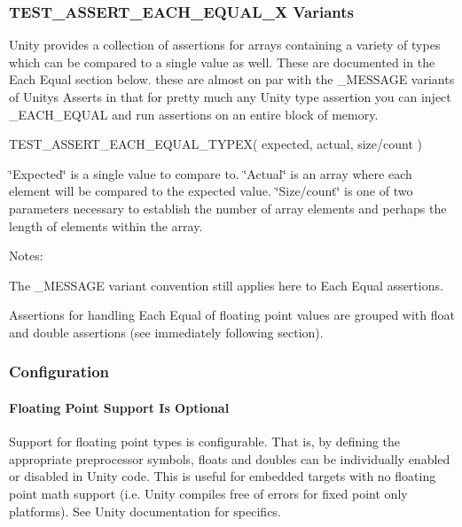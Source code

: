 \subsubsection*{T\+E\+S\+T\+\_\+\+A\+S\+S\+E\+R\+T\+\_\+\+E\+A\+C\+H\+\_\+\+E\+Q\+U\+A\+L\+\_\+X Variants}

Unity provides a collection of assertions for arrays containing a variety of types which can be compared to a single value as well. These are documented in the Each Equal section below. these are almost on par with the {\ttfamily \+\_\+\+M\+E\+S\+S\+A\+GE} variants of Unity\textquotesingle{}s Asserts in that for pretty much any Unity type assertion you can inject \+\_\+\+E\+A\+C\+H\+\_\+\+E\+Q\+U\+AL and run assertions on an entire block of memory. \begin{DoxyVerb}TEST_ASSERT_EACH_EQUAL_TYPEX( expected, actual, {size/count} )
\end{DoxyVerb}


\char`\"{}\+Expected\char`\"{} is a single value to compare to. \char`\"{}\+Actual\char`\"{} is an array where each element will be compared to the expected value. \char`\"{}\+Size/count\char`\"{} is one of two parameters necessary to establish the number of array elements and perhaps the length of elements within the array.

Notes\+:
\begin{DoxyItemize}
\item The {\ttfamily \+\_\+\+M\+E\+S\+S\+A\+GE} variant convention still applies here to Each Equal assertions.
\item Assertions for handling Each Equal of floating point values are grouped with float and double assertions (see immediately following section).
\end{DoxyItemize}

\subsubsection*{Configuration}

\paragraph*{Floating Point Support Is Optional}

Support for floating point types is configurable. That is, by defining the appropriate preprocessor symbols, floats and doubles can be individually enabled or disabled in Unity code. This is useful for embedded targets with no floating point math support (i.\+e. Unity compiles free of errors for fixed point only platforms). See Unity documentation for specifics.

